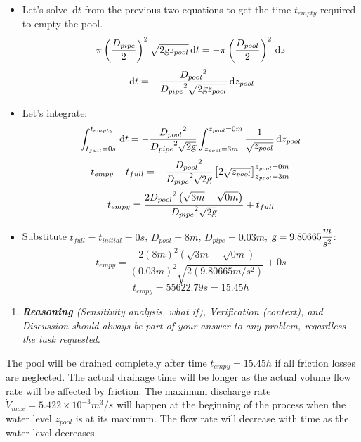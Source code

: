 \documentclass{article}
\newcommand{\ud}{\,\mathrm{d}}
\begin{document}
\begin{itemize}
\item Let's solve $\ud t$ from the previous two equations to get the time $t_{empty}$ required to empty the pool.
$$ \pi \left( \frac{D_{pipe}}{2} \right)^2 \sqrt{2 \textsl{g} z_{pool}} \ud t = - \pi \left( \frac{D_{pool}}{2} \right)^2 \ud z $$
$$ \ud t = - \frac{{D_{pool}}^2}{{D_{pipe}}^2 \sqrt{2 \textsl{g} z_{pool}}} \ud z_{pool} $$
\end{itemize}

\begin{itemize}
\item Let's integrate:
$$ \int_{t_{full} = 0s}^{t_{empty}} \ud t = - \frac{{D_{pool}}^2}{{D_{pipe}}^2 \sqrt{2 \textsl{g}}} \int_{z_{pool} = 3m}^{z_{pool} = 0m} \frac{1}{\sqrt{ z_{pool} }} \ud z_{pool} $$
$$ t_{empy} - t_{full} = - \frac{{D_{pool}}^2}{{D_{pipe}}^2 \sqrt{2 \textsl{g}}} \left[ 2 \sqrt{z_{pool} } \right]_{z_{pool} = 3m}^{z_{pool} = 0m} $$
$$ t_{empy} = \frac{2 {D_{pool}}^2 \left( \sqrt{3m} - \sqrt{0m} \right)}{{D_{pipe}}^2 \sqrt{2 \textsl{g}}} + t_{full} $$
\end{itemize}

\begin{itemize}
\item Substitute $t_{full} = t_{initial} = 0s$, $D_{pool} = 8m$, $D_{pipe} = 0.03m$, $\displaystyle \textsl{g} = 9.80665 \frac{m}{s^2}$:
$$ t_{empy} = \frac{2 {(8m)}^2 \left( \sqrt{3m} - \sqrt{0m} \right)}{{(0.03m)}^2 \sqrt{2 (9.80665 m/s^2)}} + 0s $$
$$ t_{empy} = 55622.79s = 15.45h $$
\end{itemize}

\begin{enumerate}[resume]
\item \textit{\textbf{Reasoning} (Sensitivity analysis, what if), Verification (context), and Discussion should always be part of your answer to any problem, regardless the task requested.}
\end{enumerate}

The pool will be drained completely after time $t_{empy} = 15.45h$ if all friction losses are neglected. The actual drainage time will be longer as the actual volume flow rate will be affected by friction. The maximum discharge rate $\dot{V}_{max} = 5.422 \times 10^{-3} m^3/s$ will happen at the beginning of the process when the water level $z_{pool}$ is at its maximum. The flow rate will decrease with time as the water level decreases.

\printbibliography[title={References}]
\end{document}
